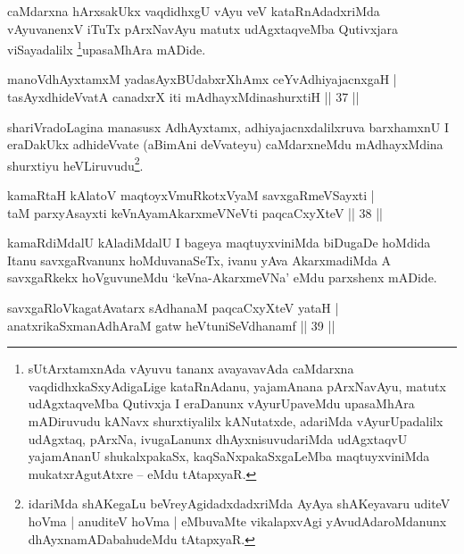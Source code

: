 \begin{artha}
caMdarxna hArxsakUkx vaqdidhxgU vAyu veV kataRnAdadxriMda vAyuvanenxV iTuTx pArxNavAyu matutx udAgxtaqveMba Qutivxjara viSayadalilx \footnote[2]{sUtArxtamxnAda vAyuvu tananx avayavavAda caMdarxna vaqdidhxkaSxyAdigaLige kataRnAdanu, yajamAnana pArxNavAyu, matutx udAgxtaqveMba Qutivxja I eraDanunx vAyurUpaveMdu upasaMhAra mADiruvudu kANavx shurxtiyalilx kANutatxde, adariMda vAyurUpadalilx udAgxtaq, pArxNa, ivugaLanunx dhAyxnisuvudariMda udAgxtaqvU yajamAnanU shukalxpakaSx, kaqSaNxpakaSxgaLeMba maqtuyxviniMda mukatxrAgutAtxre -- eMdu tAtapxyaR.}upasaMhAra mADide.
\end{artha}


\begin{shl}
manoV\s dhAyxtamxM yadasAyxBUdabxrXhAmx ceYvAdhiyajacnxgaH |\\
tasAyxdhideVvatA canadxrX iti mAdhayxMdinashurxtiH \hfill || 37 ||
\end{shl}

\begin{artha}
shariVradoLagina manasusx AdhAyxtamx, adhiyajacnxdalilxruva barxhamxnU I eraDakUkx adhideVvate (aBimAni deVvateyu) caMdarxneMdu mAdhayxMdina shurxtiyu heVLiruvudu\footnote[1]{idariMda shAKegaLu beVreyAgidadxdadxriMda AyAya shAKeyavaru uditeV hoVma | anuditeV hoVma | eMbuvaMte vikalapxvAgi yAvudAdaroMdanunx dhAyxnamADabahudeMdu tAtapxyaR.}.
\end{artha}

\begin{shl}
kamaRtaH kAlatoV maqtoyxVmuRkotxV\s yaM savxgaRmeVSayxti |\\
taM parxyAsayxti keVnAyamAkarxmeVNeVti paqcaCxyXteV \hfill || 38 ||
\end{shl}

\begin{artha}
kamaRdiMdalU kAladiMdalU I bageya maqtuyxviniMda biDugaDe hoMdida Itanu savxgaRvanunx hoMduvanaSeTx, ivanu yAva AkarxmadiMda A savxgaRkekx hoVguvuneMdu `keVna-AkarxmeVNa' eMdu parxshenx mADide.
\end{artha}


\begin{shl}
savxgaRloVkagatAvatarx sAdhanaM paqcaCxyXteV yataH |\\
anatxrikaSxmanAdhAraM gatw heVtuniSeVdhanamf \hfill || 39 ||
\end{shl}

